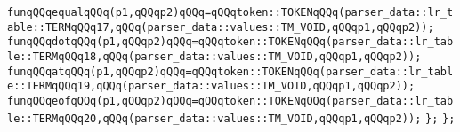\verb|funqQQqequalqQQq(p1,qQQqp2)qQQq=qQQqtoken::TOKENqQQq(parser_data::lr_table::TERMqQQq17,qQQq(parser_data::values::TM_VOID,qQQqp1,qQQqp2));|\newline
\verb|funqQQqdotqQQq(p1,qQQqp2)qQQq=qQQqtoken::TOKENqQQq(parser_data::lr_table::TERMqQQq18,qQQq(parser_data::values::TM_VOID,qQQqp1,qQQqp2));|\newline
\verb|funqQQqatqQQq(p1,qQQqp2)qQQq=qQQqtoken::TOKENqQQq(parser_data::lr_table::TERMqQQq19,qQQq(parser_data::values::TM_VOID,qQQqp1,qQQqp2));|\newline
\verb|funqQQqeofqQQq(p1,qQQqp2)qQQq=qQQqtoken::TOKENqQQq(parser_data::lr_table::TERMqQQq20,qQQq(parser_data::values::TM_VOID,qQQqp1,qQQqp2));|\newline
\verb|};|\newline
\verb|};|\newline

